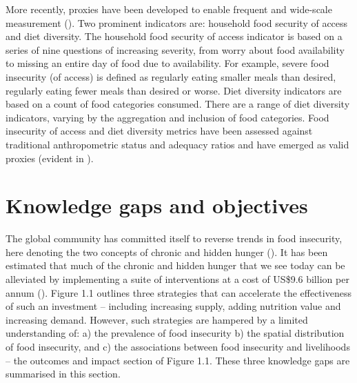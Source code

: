 More recently, proxies have been developed to enable frequent and wide-scale measurement (\citealp{Pisa2017, Keyzer2015}). Two prominent indicators are: household food security of access and diet diversity. The household food security of access indicator is based on a series of nine questions of increasing severity, from worry about food availability to missing an entire day of food due to availability. For example, severe food insecurity (of access) is defined as regularly eating smaller meals than desired, regularly eating fewer meals than desired or worse. Diet diversity indicators are based on a count of food categories consumed. There are a range of diet diversity indicators, varying by the aggregation and inclusion of food categories. Food insecurity of access and diet diversity metrics have been assessed against traditional anthropometric status and adequacy ratios and have emerged as valid proxies (evident in \citealp{McDonald2015, Rah2010, Saha2009, Coates2007, Savy2005, Steyn2006, Arimond2004, Torheim2004}).

\section{Knowledge gaps and objectives}

The global community has committed itself to reverse trends in food insecurity, here denoting the two concepts of chronic and hidden hunger (\citealp{FAO2018}). It has been estimated that much of the chronic and hidden hunger that we see today can be alleviated by implementing a suite of interventions at a cost of US\$9.6 billion per annum (\citealp{Bhutta2013}). Figure 1.1 outlines three strategies that can accelerate the effectiveness of such an investment -- including increasing supply, adding nutrition value and increasing demand. However, such strategies are hampered by a limited understanding of: a) the prevalence of food insecurity b) the spatial distribution of food insecurity, and c) the associations between food insecurity and livelihoods -- the outcomes and impact section of Figure 1.1. These three knowledge gaps are summarised in this section.

